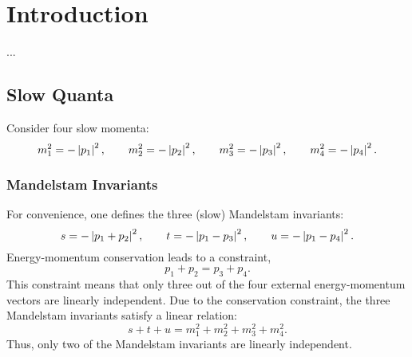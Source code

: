 \chapter{Introduction}
...
\section{Slow Quanta}
Consider four slow momenta:
\begin{equation}
	m_{1}^{2} = -\left\lvert p_{1} \right\rvert^{2}, \qquad m_{2}^{2} = -\left\lvert p_{2} \right\rvert^{2}, \qquad m_{3}^{2} = -\left\lvert p_{3} \right\rvert^{2}, \qquad m_{4}^{2} = -\left\lvert p_{4} \right\rvert^{2}.
\end{equation}
\subsection{Mandelstam Invariants}
For convenience, one defines the three (slow) Mandelstam invariants:
\begin{equation}
	s = -\left\lvert p_{1} + p_{2} \right\rvert^{2}, \qquad t = -\left\lvert p_{1} - p_{3} \right\rvert^{2}, \qquad u = -\left\lvert p_{1} - p_{4} \right\rvert^{2}. 
\end{equation}
Energy-momentum conservation leads to a constraint,
\begin{equation}
	p_{1} + p_{2} = p_{3} + p_{4}.
\end{equation}
This constraint means that only three out of the four external energy-momentum vectors are linearly independent. Due to the conservation constraint, the three Mandelstam invariants satisfy a linear relation:
\begin{equation}
	s + t + u = m_{1}^{2} + m_{2}^{2} + m_{3}^{2} + m_{4}^{2}.
	\label{eq:stu_slow}
\end{equation}
Thus, only two of the Mandelstam invariants are linearly independent.
